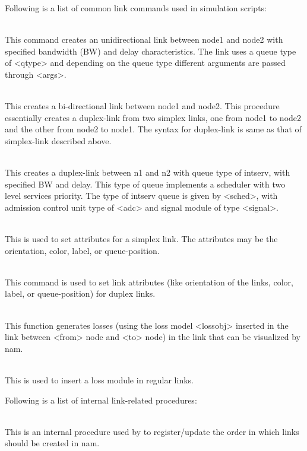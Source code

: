Following is a list of common link commands used in simulation scripts:
\begin{flushleft}

\\
This command creates an unidirectional link between node1 and node2 with
specified bandwidth (BW) and delay characteristics. The link uses a queue
type of <qtype> and depending on the queue type different arguments are
passed through <args>.


\\
This creates a bi-directional link between node1 and node2. This procedure
essentially creates a duplex-link from two simplex links, one from node1
to node2 and the other from node2 to node1. The syntax for duplex-link is
same as that of simplex-link described above.


\\
This creates a duplex-link between n1 and n2 with queue type of intserv, with
specified BW and delay. This type of queue implements a scheduler with two
level services priority. The type of intserv queue is given by <sched>, with
admission control unit type of <adc> and signal module of type <signal>.


\\
This is used to set attributes for a simplex link. The attributes may be
the orientation, color, label, or queue-position.


\\
This command is used to set link attributes (like orientation of the links,
color, label, or queue-position) for duplex links.


\\
This function generates losses (using the loss model <lossobj> inserted in
the link between <from> node and <to> node) in the link that can be
visualized by nam.


\\
This is used to insert a loss module in regular links.



Following is a list of internal link-related procedures:

\\
This is an internal procedure used by  to 
register/update the order in which links should be created in nam.



\end{flushleft}

